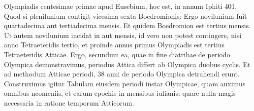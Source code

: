 Olympiadis centesimae primae apud Eusebium, hoc est, in annum
Iphiti 401.
Quod si plenilunium contigit vicesima sexta Boedromionis:
Ergo novilunium fuit quartadecima aut tertiadecima mensis.
Et quidem Boedromion est tertius mensis.
Ut autem novilunium incidat in
 aut  mensis, id vero non potest contingere,
 nisi anno Tetraeteridis
tertio, et proinde annus primus Olympiadis est tertius Tetraeteridis
Atticae.
%
Ergo, secundum ea, quae in fine diatribae de periodo
Olympica demonstravimus, periodus Attica differt ab Olympica
duobus cyclis.
Et ad methodum Atticae periodi, 38 anni de periodo
Olympica detrahendi erunt.
Construximus igitur Tabulam eiusdem
periodi instar Olympicae, quam auximus omnibus neomeniis,
et earum epochis in mensibus iulianis: quare nulla magis necessaria
in ratione temporum Atticorum.


